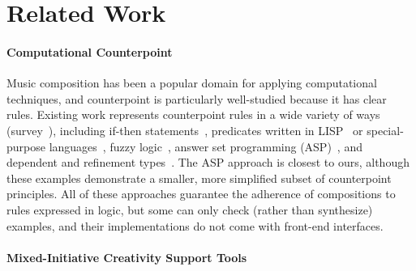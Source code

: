 \section{Related Work}
\label{sec:related-work}

\paragraph{Computational Counterpoint}
Music composition has been a popular domain for applying computational
techniques, and counterpoint is particularly well-studied because it
has clear rules.
Existing work represents counterpoint rules in a wide variety of ways (survey~\cite{torsten-constraint-programming-music}),
including if-then statements~\cite{schottstaedt-cp},
predicates written in LISP~\cite{ebcioglu-computer-counterpoint} or special-purpose languages~\cite{ebcioglu-chorale},
fuzzy logic~\cite{yilmaz-fuzzy},
answer set programming (ASP)~\cite{boenn-asp,everardo2011armin},
and dependent and refinement types~\cite{szamozvancev-mezzo,
cong-musictools, cong-weighted}.
The ASP approach is closest to ours,
although these examples demonstrate a smaller, more simplified subset of 
counterpoint principles.
All of these approaches guarantee the adherence of compositions to rules
expressed in logic, but some can only check (rather than synthesize)
examples, and their implementations do not come with front-end interfaces.

\paragraph{Mixed-Initiative Creativity Support Tools}

